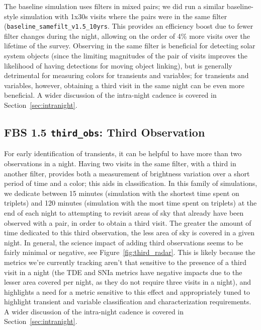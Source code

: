 The baseline simulation uses filters in mixed pairs; we did run a similar baseline-style simulation with 1x30s visits where the pairs were in the same filter ({\tt baseline\_samefilt\_v1.5\_10yrs}. This provides an efficiency boost due to fewer filter changes during the night, allowing on the order of 4\% more visits over the lifetime of the survey. Observing in the same filter is beneficial for detecting solar system objects (since the limiting magnitudes of the pair of visits improves the likelihood of having detections for moving object linking), but is generally detrimental for measuring colors for transients and variables; for transients and variables, however, obtaining a third visit in the same night can be even more beneficial. A wider discussion of the intra-night cadence is covered in Section~\ref{sec:intranight}.

\subsection{FBS 1.5 {\tt third\_obs}: Third Observation}\label{ss:thirdobs}

For early identification of transients, it can be helpful to have more than two observations in a night. Having two visits in the same filter, with a third in another filter, provides both a measurement of brightness variation over a short period of time and a color; this aids in classification. In this family of simulations, we dedicate between 15 minutes (simulation with the shortest time spent on triplets) and 120 minutes  (simulation with the most time spent on triplets) at the end of each night to attempting to revisit areas of sky that already have been observed with a pair, in order to obtain a third visit. The greater the amount of time dedicated to this third observation, the less area of sky is covered in a given night. In general, the science impact of adding third observations seems to be fairly minimal or negative, see Figure~\ref{fig:third_radar}. This is likely because the metrics we're currently tracking aren't that sensitive to the presence of a third visit in a night (the TDE and SNIa metrics have negative impacts due to the lesser area covered per night, as they do not require three visits in a night), and highlights a need for a metric sensitive to this effect and appropriately tuned to highlight transient and variable classification and characterization requirements. A wider discussion of the intra-night cadence is covered in Section~\ref{sec:intranight}.

